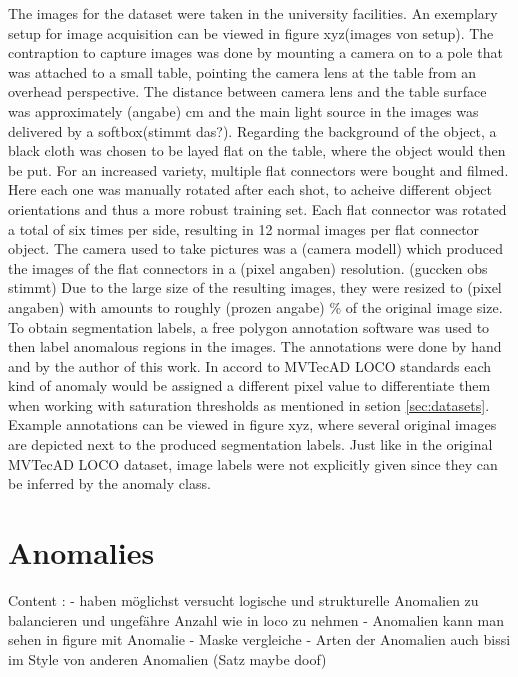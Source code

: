 The images for the dataset were taken in the university facilities. An exemplary setup for image acquisition can be viewed in figure xyz(images von setup). The contraption to capture images was 
done by mounting a camera on to a pole that was attached to a small table, pointing the camera lens at the table from an overhead perspective. The distance between camera lens and the table surface was approximately (angabe) cm and the main light source in the 
images was delivered by a softbox(stimmt das?). Regarding the background of the object, a black cloth was chosen to be layed flat on the table, where the object would then be put. For 
an increased variety, multiple flat connectors were bought and filmed. Here each one was manually rotated after each shot, to acheive different object orientations and thus a more robust training 
set. Each flat connector was rotated a total of six times per side, resulting in 12 normal images per flat connector object. \newline
The camera used to take pictures was a (camera modell) which produced the images of the flat connectors in a (pixel angaben) resolution. (guccken obs stimmt) Due to the large size of the resulting 
images, they were resized to (pixel angaben) with amounts to roughly (prozen angabe) \% of the original image size.\newline
To obtain segmentation labels, a free polygon annotation software was used to then label anomalous regions in the images. The annotations were done by hand and by the author of this work. In accord to 
MVTecAD LOCO standards \cite{LOCODentsAndScratchesBergmann2022} each kind of anomaly would be assigned a different pixel value to differentiate them when working with saturation thresholds 
as mentioned in setion \ref{sec:datasets}. Example annotations can be viewed in figure xyz, where several original images are depicted next to the produced segmentation labels. Just like in the 
original MVTecAD LOCO dataset, image labels were not explicitly given since they can be inferred by the anomaly class.


\section{Anomalies}
\label{sec:flatconnectoranomalies}

Content :
- haben möglichst versucht logische und strukturelle Anomalien zu balancieren und ungefähre Anzahl wie in loco zu nehmen 
- Anomalien kann man sehen in figure mit Anomalie - Maske vergleiche
- Arten der Anomalien auch bissi im Style von anderen Anomalien (Satz maybe doof)


